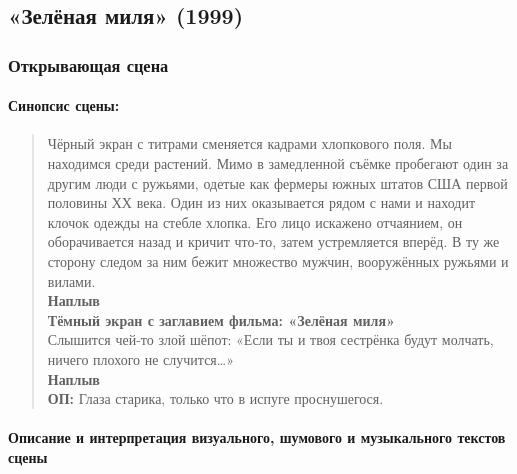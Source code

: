 \subsection{«Зелёная миля» (1999)}\label{sec.SmEt.GM}

\subsubsection{Открывающая сцена}\label{ux43eux442ux43aux440ux44bux432ux430ux44eux449ux430ux44f-ux441ux446ux435ux43dux430-3}

\paragraph{Синопсис сцены:}\label{ux441ux438ux43dux43eux43fux441ux438ux441-ux441ux446ux435ux43dux44b-3}

\begin{quote}
Чёрный экран с титрами сменяется кадрами хлопкового поля.
Мы находимся среди растений.
Мимо в замедленной съёмке пробегают один за другим люди с ружьями, одетые как фермеры южных штатов США первой половины ХХ века.
Один из них оказывается рядом с нами и находит клочок одежды на стебле хлопка.
Его лицо искажено отчаянием, он оборачивается назад и кричит что-то, затем устремляется вперёд.
В ту же сторону следом за ним бежит множество мужчин, вооружённых ружьями и вилами.\\
\textbf{Наплыв}\\
\textbf{Тёмный экран с заглавием фильма: «Зелёная миля»}\\
Слышится чей-то злой шёпот: «Если ты и твоя сестрёнка будут молчать, ничего плохого не случится\ldots{}»\\
\textbf{Наплыв}\\
\textbf{ОП:} Глаза старика, только что в испуге проснушегося.
\end{quote}

\paragraph{Описание и интерпретация визуального, шумового и музыкального текстов сцены}\label{ux43eux43fux438ux441ux430ux43dux438ux435-ux438-ux438ux43dux442ux435ux440ux43fux440ux435ux442ux430ux446ux438ux44f-ux432ux438ux437ux443ux430ux43bux44cux43dux43eux433ux43e-ux448ux443ux43cux43eux432ux43eux433ux43e-ux438-ux43cux443ux437ux44bux43aux430ux43bux44cux43dux43eux433ux43e-ux442ux435ux43aux441ux442ux43eux432-ux441ux446ux435ux43dux44b}


